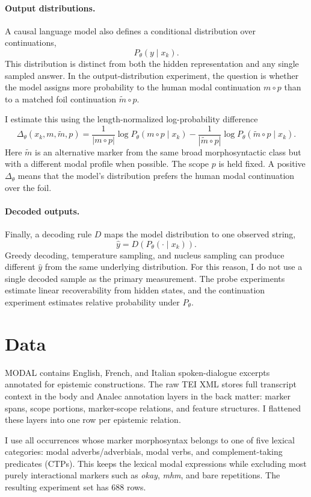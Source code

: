 \documentclass{article}
\begin{document}
\paragraph{Output distributions.}
A causal language model also defines a conditional distribution over continuations,
\[
  P_\theta(y \mid x_k).
\]
This distribution is distinct from both the hidden representation and any single sampled answer. In the output-distribution experiment, the question is whether the model assigns more probability to the human modal continuation $m \circ p$ than to a matched foil continuation $\tilde m \circ p$.

I estimate this using the length-normalized log-probability difference
\[
  \Delta_\theta(x_k,m,\tilde m,p)
    =
    \frac{1}{|m \circ p|}\log P_\theta(m \circ p \mid x_k)
      -
    \frac{1}{|\tilde m \circ p|}\log P_\theta(\tilde m \circ p \mid x_k).
\]
Here $\tilde m$ is an alternative marker from the same broad morphosyntactic class but with a different modal profile when possible. The scope $p$ is held fixed. A positive $\Delta_\theta$ means that the model's distribution prefers the human modal continuation over the foil.

\paragraph{Decoded outputs.}
Finally, a decoding rule $D$ maps the model distribution to one observed string,
\[
  \hat y = D(P_\theta(\cdot \mid x_k)).
\]
Greedy decoding, temperature sampling, and nucleus sampling can produce different $\hat y$ from the same underlying distribution. For this reason, I do not use a single decoded sample as the primary measurement. The probe experiments estimate linear recoverability from hidden states, and the continuation experiment estimates relative probability under $P_\theta$.
\section{Data}

MODAL contains English, French, and Italian spoken-dialogue excerpts annotated for epistemic constructions. The raw TEI XML stores full transcript context in the body and Analec annotation layers in the back matter: marker spans, scope portions, marker-scope relations, and feature structures. I flattened these layers into one row per epistemic relation.

I use all occurrences whose marker morphosyntax belongs to one of five lexical categories: modal adverbs/adverbials, modal verbs, and complement-taking predicates (CTPs). This keeps the lexical modal expressions while excluding most purely interactional markers such as \emph{okay}, \emph{mhm}, and bare repetitions. The resulting experiment set has 688 rows.
\end{document}
